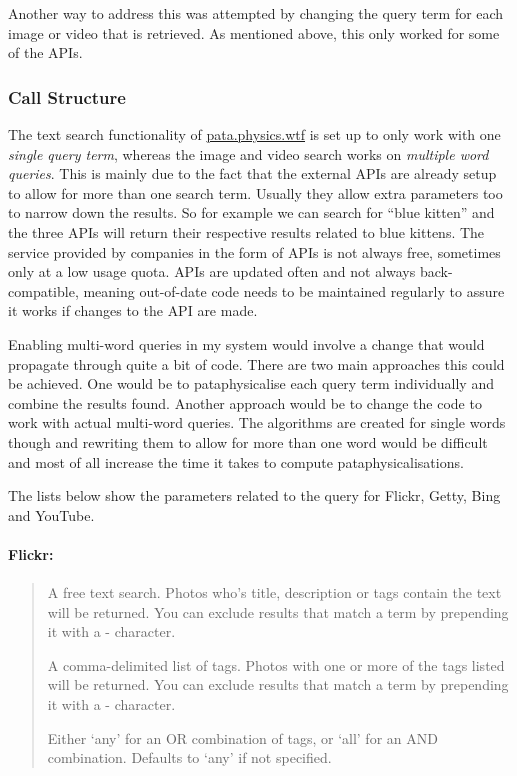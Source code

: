 Another way to address this was attempted by changing the query term for each image or video that is retrieved. As mentioned above, this only worked for some of the \ac{API}s.


\subsubsection{Call Structure}

The text search functionality of \url{pata.physics.wtf} is set up to only work with one \emph{single query term}, whereas the image and video search works on \emph{multiple word queries}. This is mainly due to the fact that the external \ac{API}s are already setup to allow for more than one search term. Usually they allow extra parameters too to narrow down the results. So for example we can search for ``blue kitten'' and the three \ac{API}s will return their respective results related to blue kittens. The service provided by companies in the form of \ac{API}s is not always free, sometimes only at a low usage quota. \ac{API}s are updated often and not always back-compatible, meaning out-of-date code needs to be maintained regularly to assure it works if changes to the \ac{API} are made.

Enabling multi-word queries in my system would involve a change that would propagate through quite a bit of code. There are two main approaches this could be achieved. One would be to pataphysicalise each query term individually and combine the results found. Another approach would be to change the code to work with actual multi-word queries. The algorithms are created for single words though and rewriting them to allow for more than one word would be difficult and most of all increase the time it takes to compute pataphysicalisations.

The lists below show the parameters related to the query for Flickr, Getty, Bing and YouTube.

\paragraph{Flickr:}
\begin{quotation}
  \begin{description}
  \vspace{-1cm}
    \item[text (Optional)] A free text search. Photos who's title, description or tags contain the text will be returned. You can exclude results that match a term by prepending it with a - character.
    \item[tags (Optional)] A comma-delimited list of tags. Photos with one or more of the tags listed will be returned. You can exclude results that match a term by prepending it with a - character.
    \item[tag\_mode (Optional)] Either `any' for an OR combination of tags, or `all' for an AND combination. Defaults to `any' if not specified.
  \end{description}
\end{quotation}

